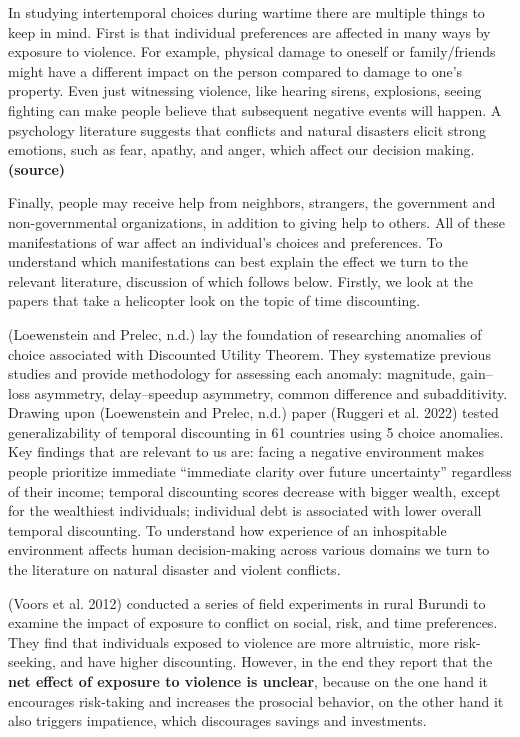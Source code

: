 \documentclass[
  letterpaper,
  DIV=11,
  numbers=noendperiod]{scrartcl}
\begin{document}
In studying intertemporal choices during wartime there are multiple
things to keep in mind. First is that individual preferences are
affected in many ways by exposure to violence. For example, physical
damage to oneself or family/friends might have a different impact on the
person compared to damage to one's property. Even just witnessing
violence, like hearing sirens, explosions, seeing fighting can make
people believe that subsequent negative events will happen. A psychology
literature suggests that conflicts and natural disasters elicit strong
emotions, such as fear, apathy, and anger, which affect our decision
making. \textbf{(source)}

Finally, people may receive help from neighbors, strangers, the
government and non-governmental organizations, in addition to giving
help to others. All of these manifestations of war affect an
individual's choices and preferences. To understand which manifestations
can best explain the effect we turn to the relevant literature,
discussion of which follows below. Firstly, we look at the papers that
take a helicopter look on the topic of time discounting.

\hfill\break
(Loewenstein and Prelec, n.d.) lay the foundation of researching
anomalies of choice associated with Discounted Utility Theorem. They
systematize previous studies and provide methodology for assessing each
anomaly: magnitude, gain--loss asymmetry, delay--speedup asymmetry,
common difference and subadditivity. Drawing upon (Loewenstein and
Prelec, n.d.) paper (Ruggeri et al. 2022) tested generalizability of
temporal discounting in 61 countries using 5 choice anomalies. Key
findings that are relevant to us are: facing a negative environment
makes people prioritize immediate ``immediate clarity over future
uncertainty'' regardless of their income; temporal discounting scores
decrease with bigger wealth, except for the wealthiest individuals;
individual debt is associated with lower overall temporal discounting.
To understand how experience of an inhospitable environment affects
human decision-making across various domains we turn to the literature
on natural disaster and violent conflicts.

(Voors et al. 2012) conducted a series of field experiments in rural
Burundi to examine the impact of exposure to conflict on social, risk,
and time preferences. They find that individuals exposed to violence are
more altruistic, more risk-seeking, and have higher discounting.
However, in the end they report that the \textbf{net effect of exposure
to violence is unclear}, because on the one hand it encourages
risk-taking and increases the prosocial behavior, on the other hand it
also triggers impatience, which discourages savings and investments.
\end{document}
